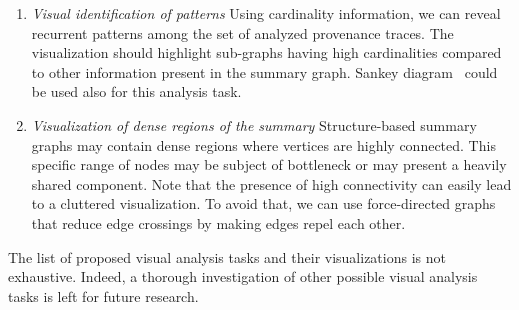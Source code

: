 \begin{enumerate}
\item \emph{Visual identification of patterns }  Using cardinality information, we can reveal recurrent patterns among the set of analyzed provenance traces. The visualization should highlight sub-graphs having high cardinalities  compared to other information present in the summary graph. Sankey diagram~\cite{Riehmann:2015} could be used also for this analysis task. \label{itm:t5} 

\item \emph{Visualization of dense regions of the summary } Structure-based summary graphs may contain dense regions where vertices are highly connected.
This specific range of nodes may be subject of bottleneck or may present a heavily shared component.
Note that the presence of high connectivity can easily lead  to a cluttered visualization. 
To avoid that, we can use force-directed graphs that reduce edge crossings by making edges repel each other. \label{itm:t6} 



\end{enumerate}
The list of proposed visual analysis tasks and their visualizations is not exhaustive. Indeed, a thorough investigation of other possible visual analysis tasks is left for future research.
